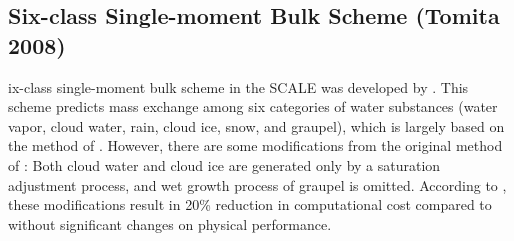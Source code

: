 \subsection{Six-class Single-moment Bulk Scheme (Tomita 2008)}
ix-class single-moment bulk scheme in the SCALE was developed by \citet{tomita_2008}. This scheme predicts mass exchange among six categories of water substances (water vapor, cloud water, rain, cloud ice, snow, and graupel), which is largely based on the method of \citet{Lin_etal}. However, there are some modifications from the original method of \citet{Lin_etal}: Both cloud water and cloud ice are generated only by a saturation adjustment process, and wet growth process of graupel is omitted. According to \citet{tomita_2008}, these modifications result in 20\% reduction in computational cost compared to \citet{Lin_etal} without significant changes on physical performance.
